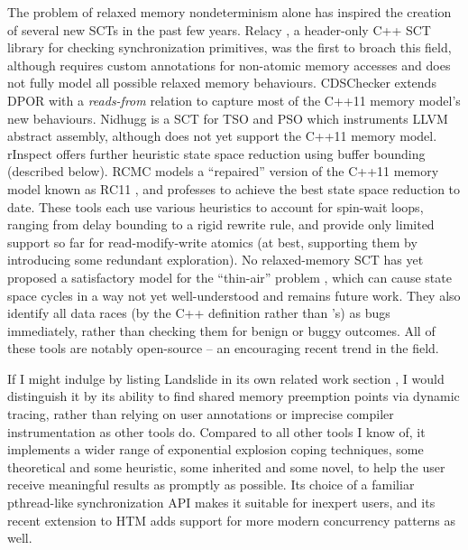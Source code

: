 The problem of relaxed memory nondeterminism alone has inspired the creation of several new SCTs in the past few years.
Relacy \cite{relacy}, a header-only C++ SCT library for checking synchronization primitives,
was the first to broach this field,
although requires custom annotations for non-atomic memory accesses
and
does not fully model all possible relaxed memory behaviours.
CDSChecker \cite{cdschecker} extends DPOR with a {\em reads-from} relation
to capture most of the C++11 memory model's new behaviours.
Nidhugg \cite{nidhugg} is a SCT for TSO and PSO which instruments LLVM abstract assembly,
although does not yet support the C++11 memory model.
rInspect \cite{tsopso}
offers further heuristic state space reduction using buffer bounding (described below).
RCMC \cite{rcmc} models a ``repaired'' version of the C++11 memory model known as RC11 \cite{rc11},
and professes to achieve the best state space reduction to date.
These tools each use various heuristics to account for spin-wait loops,
ranging from delay bounding \cite{bpor} to a rigid rewrite rule,
and provide only limited support so far for read-modify-write atomics
(at best, supporting them by introducing %
some redundant exploration).
%
No relaxed-memory SCT has yet proposed a satisfactory model for the ``thin-air'' problem \cite{sully-thesis},
which can cause state space cycles in a way not yet well-understood and remains future work.
They also identify all data races
(by the C++ definition rather than \sect{\ref{sec:quicksand-soundness}}'s)
as bugs immediately, rather than checking them for benign or buggy outcomes.
All of these tools are notably open-source -- an encouraging recent trend in the field.


If I might indulge by listing Landslide in its own related work section \cite{this-thesis},
I would distinguish it by its ability to find shared memory preemption points via dynamic tracing,
rather than relying on user annotations or imprecise compiler instrumentation
as other tools do.
Compared to all other tools I know of,
it implements a wider range of exponential explosion coping techniques,
some theoretical and some heuristic,
some inherited and some novel,
to help the user receive meaningful results as promptly as possible.
Its choice of a familiar pthread-like synchronization API makes it suitable for inexpert users,
and its recent extension to HTM adds support for more modern concurrency patterns as well.

